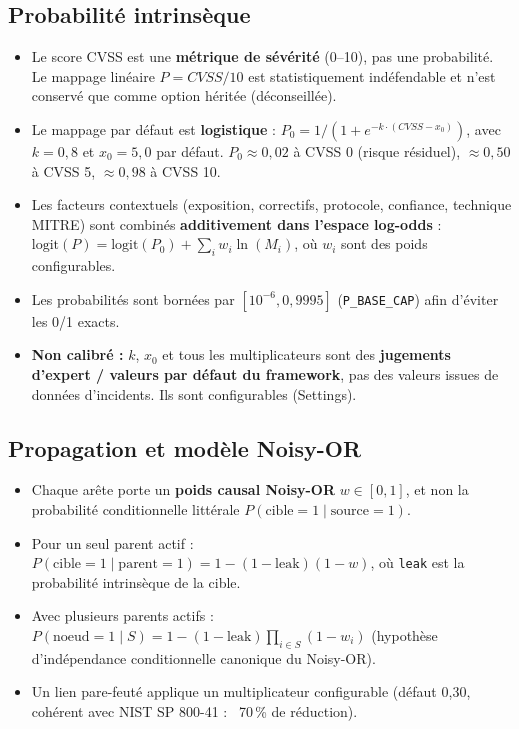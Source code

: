 \documentclass[12pt,a4paper]{article}
\newcommand{\forcereset}[1]{%
    \needspace{#1\baselineskip}%
}
\begin{document}
\subsection{Probabilité intrinsèque}
\forcereset{4}
\begin{itemize}[leftmargin=1.2cm, itemsep=0.2\baselineskip]
    \item Le score CVSS est une \textbf{métrique de sévérité} (0--10), pas une probabilité. Le mappage linéaire $P = CVSS/10$ est statistiquement indéfendable et n'est conservé que comme option héritée (déconseillée).
    \item Le mappage par défaut est \textbf{logistique} : $P_0 = 1/(1+e^{-k\cdot(CVSS-x_0)})$, avec $k=0{,}8$ et $x_0=5{,}0$ par défaut. $P_0\approx0{,}02$ à CVSS 0 (risque résiduel), $\approx0{,}50$ à CVSS 5, $\approx0{,}98$ à CVSS 10.
    \item Les facteurs contextuels (exposition, correctifs, protocole, confiance, technique MITRE) sont combinés \textbf{additivement dans l'espace log-odds} : $\mathrm{logit}(P)=\mathrm{logit}(P_0)+\sum_i w_i\ln(M_i)$, où $w_i$ sont des poids configurables.
    \item Les probabilités sont bornées par $[10^{-6}, 0{,}9995]$ (\texttt{P\_BASE\_CAP}) afin d'éviter les 0/1 exacts.
    \item \textbf{Non calibré :} $k$, $x_0$ et tous les multiplicateurs sont des \textbf{jugements d'expert / valeurs par défaut du framework}, pas des valeurs issues de données d'incidents. Ils sont configurables (Settings).
\end{itemize}

\subsection{Propagation et modèle Noisy-OR}
\forcereset{4}
\begin{itemize}[leftmargin=1.2cm, itemsep=0.2\baselineskip]
    \item Chaque arête porte un \textbf{poids causal Noisy-OR} $w\in[0,1]$, et non la probabilité conditionnelle littérale $P(\text{cible}=1\mid\text{source}=1)$.
    \item Pour un seul parent actif : $P(\text{cible}=1\mid\text{parent}=1)=1-(1-\text{leak})(1-w)$, où \texttt{leak} est la probabilité intrinsèque de la cible.
    \item Avec plusieurs parents actifs : $P(\text{noeud}=1\mid S)=1-(1-\text{leak})\prod_{i\in S}(1-w_i)$ (hypothèse d'indépendance conditionnelle canonique du Noisy-OR).
    \item Un lien pare-feuté applique un multiplicateur configurable (défaut 0{,}30, cohérent avec NIST SP 800-41 : ~70\,\% de réduction).
\end{itemize}
\end{document}
